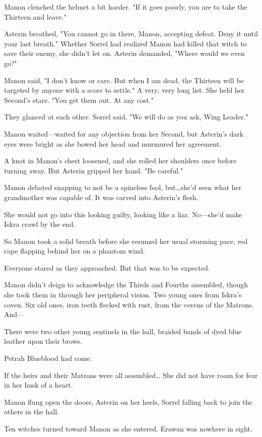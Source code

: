 Manon clenched the helmet a bit harder.
"If it goes poorly, you are to take the Thirteen and leave."

Asterin breathed, "You cannot go in there, Manon, accepting defeat.
Deny it until your last breath."
Whether Sorrel had realized Manon had killed that witch to save their enemy, she didn't let on.
Asterin demanded, "Where would we even go?"

Manon said, "I don't know or care.
But when I am dead, the Thirteen will be targeted by anyone with a score to settle."
A very, very long list.
She held her Second's stare.
"You get them out.
At any cost."

They glanced at each other.
Sorrel said, "We will do as you ask, Wing Leader."

Manon waited---waited for any objection from her Second, but Asterin's dark eyes were bright as she bowed her head and murmured her agreement.

A knot in Manon's chest loosened, and she rolled her shoulders once before turning away.
But Asterin gripped her hand.
"Be careful."

Manon debated snapping to not be a spineless fool, but\ldots she'd seen what her grandmother was capable of.
It was carved into Asterin's flesh.

She would not go into this looking guilty, looking like a liar.
No---she'd make Iskra crawl by the end.

So Manon took a solid breath before she resumed her usual storming pace, red cape flapping behind her on a phantom wind.

Everyone stared as they approached.
But that was to be expected.

Manon didn't deign to acknowledge the Thirds and Fourths assembled, though she took them in through her peripheral vision.
Two young ones from Iskra's coven.
Six old ones, iron teeth flecked with rust, from the covens of the Matrons.
And---

There were two other young sentinels in the hall, braided bands of dyed blue leather upon their brows.

Petrah Blueblood had come.

If the heirs and their Matrons were all assembled\ldots{} She did not have room for fear in her husk of a heart.

Manon flung open the doors, Asterin on her heels, Sorrel falling back to join the others in the hall.

Ten witches turned toward Manon as she entered.
Erawan was nowhere in sight.

